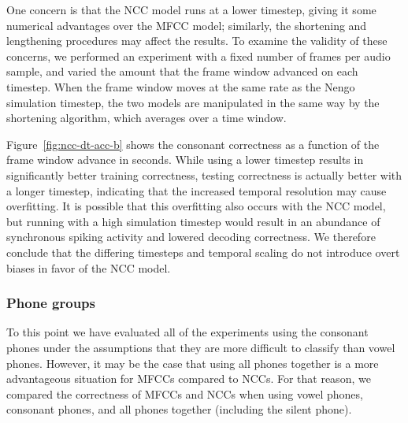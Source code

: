 One concern is that
the NCC model runs at a lower timestep,
giving it some numerical advantages
over the MFCC model;
similarly, the shortening and lengthening
procedures may affect the results.
To examine the validity of these concerns,
we performed an experiment
with a fixed number of frames
per audio sample,
and varied the amount that the frame window
advanced on each timestep.
When the frame window moves at the
same rate as the Nengo simulation timestep,
the two models are manipulated
in the same way by the
shortening algorithm,
which averages over a time window.


Figure~\ref{fig:ncc-dt-acc-b}
shows the consonant correctness
as a function of the
frame window advance in seconds.
While using a lower timestep results in
significantly better training correctness,
testing correctness is actually better
with a longer timestep,
indicating that the increased temporal
resolution may cause overfitting.
It is possible that this overfitting
also occurs with the NCC model,
but running with a high simulation timestep
would result in an abundance of
synchronous spiking activity
and lowered decoding correctness.
We therefore conclude that the
differing timesteps and temporal scaling
do not introduce overt biases
in favor of the NCC model.

\subsubsection{Phone groups}

To this point we have
evaluated all of the experiments using
the consonant phones
under the assumptions that they are
more difficult to classify than vowel phones.
However, it may be the case that
using all phones together
is a more advantageous situation
for MFCCs compared to NCCs.
For that reason,
we compared the correctness
of MFCCs and NCCs when using
vowel phones, consonant phones,
and all phones together
(including the silent phone).


